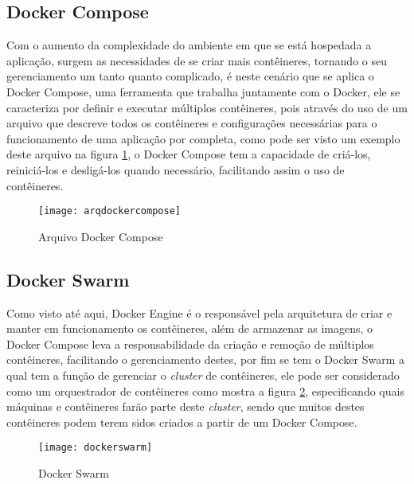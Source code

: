 \subsection{Docker Compose}
Com o aumento da complexidade do ambiente em que se está hospedada a aplicação, surgem as necessidades de se criar mais contêineres, tornando o seu gerenciamento um tanto quanto complicado, é neste cenário que se aplica o Docker Compose, uma ferramenta que trabalha juntamente com o Docker, ele se caracteriza por definir e executar múltiplos contêineres, pois através do uso de um arquivo que descreve todos os contêineres e configurações necessárias para o funcionamento de uma aplicação por completa, como pode ser visto um exemplo deste arquivo na figura \ref{fig:arqdockercompose}, o Docker Compose tem a capacidade de criá-los, reiniciá-los e desligá-los quando necessário, facilitando assim o uso de contêineres.~\cite{docker}

\begin{figure}[!h]
\caption{\label{fig:arqdockercompose} Arquivo Docker Compose}
\begin{center}
\texttt{[image: arqdockercompose]}
\end{center}
\end{figure}

\subsection{Docker Swarm}
Como visto até aqui, Docker Engine é o responsável pela arquitetura de criar e manter em funcionamento os contêineres, além de armazenar as imagens, o Docker Compose leva a responsabilidade da criação e remoção de múltiplos contêineres, facilitando o gerenciamento destes, por fim se tem o Docker Swarm a qual tem a função de gerenciar o \textit{cluster} de contêineres, ele pode ser considerado como um orquestrador de contêineres como mostra a figura \ref{fig:dockerswarm}, especificando quais máquinas e contêineres farão parte deste \textit{cluster}, sendo que muitos destes contêineres podem terem sidos criados a partir de um Docker Compose.   

\begin{figure}[!h]
\caption{\label{fig:dockerswarm} Docker Swarm}
\begin{center}
\texttt{[image: dockerswarm]}
\end{center}
\end{figure}


